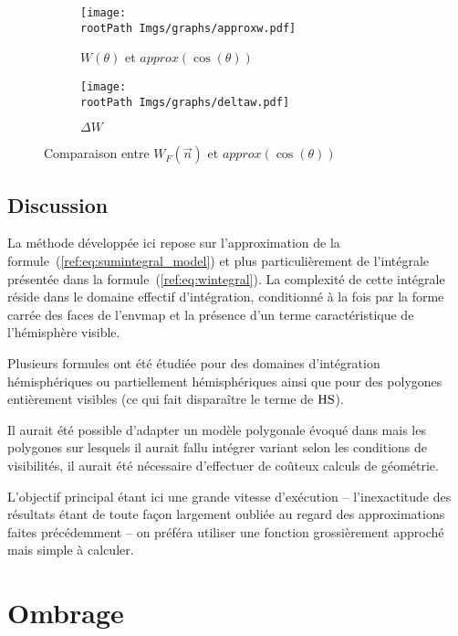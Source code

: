 \documentclass[10pt,a4paper,twoside, twocolumn]{report}
\newcommand*{\rootPath}{../}
\begin{document}
\begin{figure}[!ht]\centering
	\begin{subfigure}[b]{0.4\textwidth}\centering
		\texttt{[image: \\rootPath Imgs/graphs/approxw.pdf]}
		\caption{$W(\theta)$ et $approx(\cos(\theta))$}
	\end{subfigure}
	\begin{subfigure}[b]{0.4\textwidth}\centering
		\texttt{[image: \\rootPath Imgs/graphs/deltaw.pdf]}
		\caption{$\Delta W$}
	\end{subfigure}
	\caption{Comparaison entre $W_F(\vec n)$ et $approx(\cos(\theta))$ }
	\label{fig:curve:w_approx}
\end{figure}


\subsection{Discussion}

La méthode développée ici repose sur l’approximation de la formule~(\ref{ref:eq:sumintegral_model}) et plus particulièrement de l’intégrale présentée dans la formule~(\ref{ref:eq:wintegral}). La complexité de cette intégrale réside dans le domaine effectif d’intégration, conditionné à la fois par la forme carrée des faces de l’envmap et la présence d’un terme caractéristique de l’hémisphère visible.

Plusieurs formules ont été étudiée pour des domaines d’intégration hémisphériques ou partiellement hémisphériques ainsi que pour des polygones entièrement visibles \cite{Snyder1996} (ce qui fait disparaître le terme de $\operatorname{HS}$).

Il aurait été possible d’adapter un modèle polygonale évoqué dans \cite{Snyder1996} mais les polygones sur lesquels il aurait fallu intégrer variant selon les conditions de visibilités, il aurait été nécessaire d’effectuer de coûteux calculs de géométrie.

L’objectif principal étant ici une grande vitesse d’exécution -- l’inexactitude des résultats étant de toute façon largement oubliée au regard des approximations faites précédemment -- on préféra utiliser une fonction grossièrement approché mais simple à calculer.




\section{Ombrage}\label{section:ombres}
\end{document}
